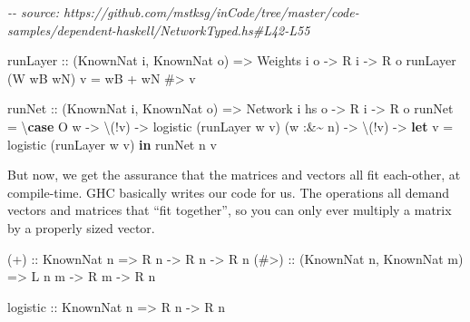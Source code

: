 \documentclass[]{article}
\newenvironment{Shaded}{}{}
\newcommand{\CommentTok}[1]{\textcolor[rgb]{0.38,0.63,0.69}{\textit{#1}}}
\newcommand{\DataTypeTok}[1]{\textcolor[rgb]{0.56,0.13,0.00}{#1}}
\newcommand{\KeywordTok}[1]{\textcolor[rgb]{0.00,0.44,0.13}{\textbf{#1}}}
\newcommand{\NormalTok}[1]{#1}
\newcommand{\OperatorTok}[1]{\textcolor[rgb]{0.40,0.40,0.40}{#1}}
\newcommand{\OtherTok}[1]{\textcolor[rgb]{0.00,0.44,0.13}{#1}}
\begin{document}
\begin{Shaded}
\begin{Highlighting}[]
\CommentTok{{-}{-} source: https://github.com/mstksg/inCode/tree/master/code{-}samples/dependent{-}haskell/NetworkTyped.hs\#L42{-}L55}

\OtherTok{runLayer ::}\NormalTok{ (}\DataTypeTok{KnownNat}\NormalTok{ i, }\DataTypeTok{KnownNat}\NormalTok{ o)}
         \OtherTok{=\textgreater{}} \DataTypeTok{Weights}\NormalTok{ i o}
         \OtherTok{{-}\textgreater{}} \DataTypeTok{R}\NormalTok{ i}
         \OtherTok{{-}\textgreater{}} \DataTypeTok{R}\NormalTok{ o}
\NormalTok{runLayer (}\DataTypeTok{W}\NormalTok{ wB wN) v }\OtherTok{=}\NormalTok{ wB }\OperatorTok{+}\NormalTok{ wN }\OperatorTok{\#\textgreater{}}\NormalTok{ v}

\OtherTok{runNet ::}\NormalTok{ (}\DataTypeTok{KnownNat}\NormalTok{ i, }\DataTypeTok{KnownNat}\NormalTok{ o)}
       \OtherTok{=\textgreater{}} \DataTypeTok{Network}\NormalTok{ i hs o}
       \OtherTok{{-}\textgreater{}} \DataTypeTok{R}\NormalTok{ i}
       \OtherTok{{-}\textgreater{}} \DataTypeTok{R}\NormalTok{ o}
\NormalTok{runNet }\OtherTok{=}\NormalTok{ \textbackslash{}}\KeywordTok{case}
   \DataTypeTok{O}\NormalTok{ w }\OtherTok{{-}\textgreater{}}\NormalTok{ \textbackslash{}(}\OperatorTok{!}\NormalTok{v) }\OtherTok{{-}\textgreater{}}\NormalTok{ logistic (runLayer w v)}
\NormalTok{   (w }\OperatorTok{:\&\textasciitilde{}}\NormalTok{ n\textquotesingle{}) }\OtherTok{{-}\textgreater{}}\NormalTok{ \textbackslash{}(}\OperatorTok{!}\NormalTok{v) }\OtherTok{{-}\textgreater{}} \KeywordTok{let}\NormalTok{ v\textquotesingle{} }\OtherTok{=}\NormalTok{ logistic (runLayer w v)}
                          \KeywordTok{in}\NormalTok{ runNet n\textquotesingle{} v\textquotesingle{}}
\end{Highlighting}
\end{Shaded}

But now, we get the assurance that the matrices and vectors all fit each-other,
at compile-time. GHC basically writes our code for us. The operations all demand
vectors and matrices that ``fit together'', so you can only ever multiply a
matrix by a properly sized vector.

\begin{Shaded}
\begin{Highlighting}[]
\OtherTok{(+)  ::} \DataTypeTok{KnownNat}\NormalTok{ n}
     \OtherTok{=\textgreater{}} \DataTypeTok{R}\NormalTok{ n }\OtherTok{{-}\textgreater{}} \DataTypeTok{R}\NormalTok{ n }\OtherTok{{-}\textgreater{}} \DataTypeTok{R}\NormalTok{ n}
\OtherTok{(\#\textgreater{}) ::}\NormalTok{ (}\DataTypeTok{KnownNat}\NormalTok{ n, }\DataTypeTok{KnownNat}\NormalTok{ m)}
     \OtherTok{=\textgreater{}} \DataTypeTok{L}\NormalTok{ n m }\OtherTok{{-}\textgreater{}} \DataTypeTok{R}\NormalTok{ m }\OtherTok{{-}\textgreater{}} \DataTypeTok{R}\NormalTok{ n}

\OtherTok{logistic ::} \DataTypeTok{KnownNat}\NormalTok{ n}
         \OtherTok{=\textgreater{}} \DataTypeTok{R}\NormalTok{ n }\OtherTok{{-}\textgreater{}} \DataTypeTok{R}\NormalTok{ n}
\end{Highlighting}
\end{Shaded}
\end{document}
